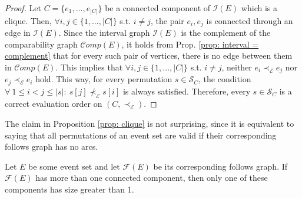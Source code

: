 \begin{proof} 
Let $C=\{e_1,...,e_{|C|}\}$ be a connected component of $\mathcal{I}(E)$ which is a clique.
Then, $\forall i,j \in \{1,...,|C|\}$ s.t. $i\neq j$, the pair $e_i, e_j$ is connected through an edge in $\mathcal{I}(E)$.
Since the interval graph $\mathcal{I}(E)$ is the complement of the comparability graph $\mathcal{C}omp(E)$, it holds from Prop. \ref{prop: interval = complement} that for every such pair of vertices, there is no edge between them in $\mathcal{C}omp(E)$.
This implies that $\forall i,j \in \{1,...,|C|\}$ s.t. $i \neq j$, neither $e_i \prec_{\mathcal{E}} e_j$ nor $e_j \prec_{\mathcal{E}} e_i$ hold.
This way, for every permutation $s \in \mathcal{S}_C$, the condition
$\forall ~ 1 \leq i < j \leq |s|: ~ s[j] \not \prec_{\mathcal{E}} s[i]$ is always satisfied.
Therefore, every $s \in \mathcal{S}_C$ is a correct evaluation order on $(C, \prec_{\mathcal{E}})$. 
\end{proof}

The claim in Proposition \ref{prop: clique} is not surprising, since it is equivalent to saying that all permutations of an event set are valid if their corresponding follows graph has no arcs.




\begin{proposition}\label{prop: component size}
Let $E$ be some event set and let $\mathcal{F}(E)$ be its corresponding follows graph.
If $\mathcal{F}(E)$ has more than one connected component, then only one of these components has size greater than 1.
\end{proposition}


